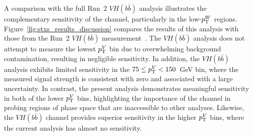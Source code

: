 A comparison with the full Run~2 $VH(b\bar{b})$ analysis illustrates the complementary sensitivity of the \wh{} channel, particularly in the low-$p_{\mathrm{T}}^{W}$ regions. Figure~\ref{fig:stxs_results_discussion} compares the results of this analysis with those from the Run~2 $VH(b\bar{b})$ measurement~\cite{ATLAS:2024yzu}. The $VH(b\bar{b})$ analysis does not attempt to measure the lowest $p_{\mathrm{T}}^{V}$ bin due to overwhelming background contamination, resulting in negligible sensitivity. In addition, the $VH(b\bar{b})$ analysis exhibits limited sensitivity in the $75 \leq p_{\mathrm{T}}^{V} < 150$~GeV bin, where the measured signal strength is consistent with zero and associated with a large uncertainty. In contrast, the present analysis demonstrates meaningful sensitivity in both of the lower $p_{\mathrm{T}}^{V}$ bins, highlighting the importance of the \wh{} channel in probing regions of phase space that are inaccessible to other analyses. Likewise, the $VH(b\bar{b})$ channel provides superior sensitivity in the higher $p_{\mathrm{T}}^{V}$ bins, where the current analysis has almost no sensitivity.
